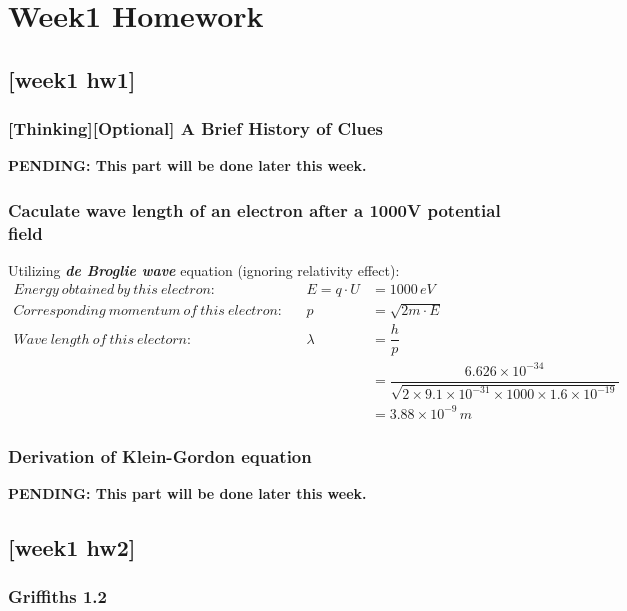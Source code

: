 \section{Week1 Homework}\SectionRule
\subsection{[week1 hw1]}
\subsubsection{[Thinking][Optional] A Brief History of Clues}
{\color{hwSolution}
    \textbf{PENDING: This part will be done later this week.}
}
\subsubsection{Caculate wave length of an electron after a 1000V potential field}

{\color{hwSolution}
Utilizing \textit{\textbf{de Broglie wave}} equation (ignoring relativity effect):
\begin{align*}
    Energy~obtained~by~this~electron:&& E = q\cdot U &= 1000\,eV\\
    Corresponding~momentum~of~this~electron:&& p &= \sqrt{2m\cdot E}\\
    Wave~length~of~this~electorn:&& \lambda &= \dfrac{h}{p}\\
    &&&=\dfrac{6.626\times10^{-34}}{\sqrt{2\times 9.1\times 10^{-31}\times 1000\times 1.6\times10^{-19}}}\\
    &&&=3.88\times 10^{-9}\,m
\end{align*}
}

\subsubsection{Derivation of Klein-Gordon equation}

{\color{hwSolution}
    \textbf{PENDING: This part will be done later this week.}
}
\subsection*{[week1 hw2]}
\subsubsection{Griffiths 1.2}

